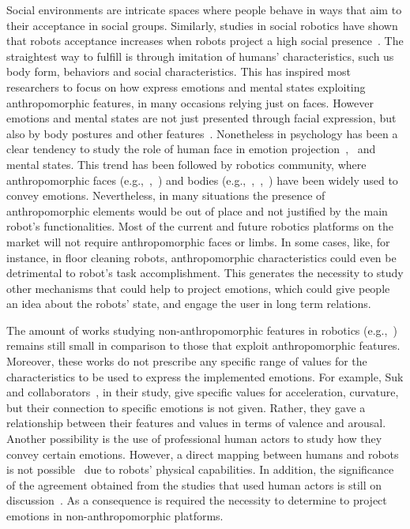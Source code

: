 Social environments are intricate spaces where people behave in ways that aim to their acceptance in social groups. Similarly, studies in social robotics have shown that robots acceptance increases when robots project a high social presence~\cite{Heerink08}. The straightest way to fulfill is through imitation of humans' characteristics, such us body form, behaviors and social characteristics. This has inspired most researchers to focus on how express emotions and mental states exploiting anthropomorphic features, in many occasions relying just on faces. However emotions and mental states are not just presented through facial expression, but also by body postures and other features~\cite{Gelder2008}. Nonetheless in psychology has been a clear tendency to study the role of human face in emotion projection~\cite{Ekman2004},~\cite{kleinsmith2012affective} and mental states. This trend has been followed by robotics community, where anthropomorphic faces (e.g.,~\cite{Arras2012},~\cite{Breazeal2002}) and bodies (e.g.,~\cite{Canamero2010},~\cite{haering2011},~\cite{Destephe2013}) have been widely used to convey emotions.
Nevertheless, in many situations the presence of anthropomorphic elements would be out of place and not justified by the main robot's functionalities. Most of the current and future robotics platforms on the market will not require anthropomorphic faces or limbs. In some cases, like, for instance, in floor cleaning robots, anthropomorphic characteristics could even be detrimental to robot's task accomplishment.
This generates the necessity to study other mechanisms that could help to project emotions, which could give people an idea about the robots' state, and engage the user in long term relations.

The amount of works studying non-anthropomorphic features in robotics (e.g.,~\cite{Saerbeck2010,Lakatos2014,Sharma2013,Novika2015}) remains still small in comparison to those that exploit anthropomorphic features. Moreover, these works do not prescribe any specific range of values for the characteristics to be used to express the  implemented emotions. For example, Suk and collaborators~\cite{NAM2014}, in their study, give specific values for acceleration, curvature, but their connection to specific emotions is not given. Rather, they gave a relationship between their features and values in terms of valence and arousal. Another possibility is the use of professional human actors to study how they convey certain emotions. However, a direct mapping between humans and robots is not possible~\cite{Saerbeck2007,Canamero2010} due to robots' physical capabilities. In addition, the significance of the agreement obtained from the studies that used human actors is still on discussion~\cite{Russell2003}. As a consequence is required the necessity to determine to project emotions in non-anthropomorphic platforms.
 
